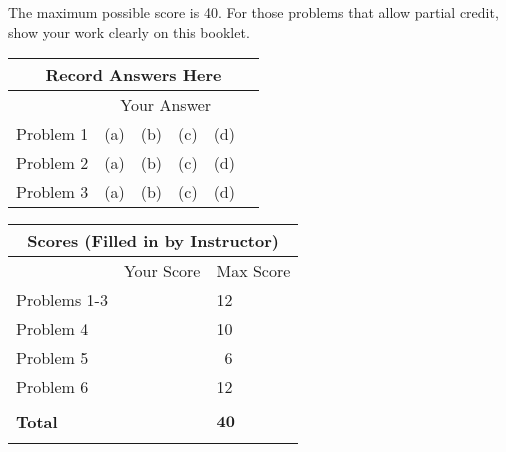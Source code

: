 \documentclass[letterpaper]{article}
\begin{document}
\noindent The maximum possible score is 40. For those problems that allow partial credit, show your work clearly on this booklet.

\newpage

\vspace*{1in}

\begin{center}
\Large
\begin{tabular}{|p{1.2in}|p{1.5in}|}
\hline
\multicolumn{2}{|c|}{\textbf{Record Answers Here}}\\
\hline
 & ~~Your Answer\\
\hline
Problem 1 &   (a)~~(b)~~(c)~~(d)~~\\
\hline
Problem 2 &   (a)~~(b)~~(c)~~(d)~~\\
\hline
Problem 3 &   (a)~~(b)~~(c)~~(d)~~\\
\hline
\end{tabular}
\end{center}

\vspace*{1in}

\begin{center}
\begin{tabular}{|p{2in}|p{1in}|p{1in}|}
\hline
\multicolumn{3}{|c|}{\textbf{Scores (Filled in by Instructor)}}\\
\hline
 & Your Score& Max Score \\
\hline
Problems 1-3 &  &   12\\
\hline
Problem 4 &  &   10\\
\hline
Problem 5 &  &   ~6\\
\hline
Problem 6 &  &   12\\
\hline
& & \\
\hline
\textbf{Total} &  &   $\mathbf{40}$\\
\hline
& & \\
\hline
%
\end{tabular}
\end{center}

\newpage

%
%
%
\end{document}
